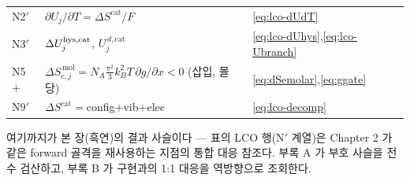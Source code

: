 \begin{table}[t]
\begin{tabular}{l l l}
N2$'$ & $\partial U_j/\partial T=\Delta S^\mathrm{cat}/F$ & \eqref{eq:lco-dUdT} \\
N3$'$ & $\Delta U_j^{\mathrm{hys},\mathrm{cat}}$, $U_j^{\,d,\mathrm{cat}}$ & \eqref{eq:lco-dUhys},\eqref{eq:lco-Ubranch} \\
N5$+$ & $\Delta S_{e,j}^{\,\mathrm{mol}}=N_A\tfrac{\pi^2}{3}k_B^2T\,\partial g/\partial x<0$ (삽입, 몰당) & \eqref{eq:dSemolar},\eqref{eq:ggate} \\
N9$'$ & $\Delta S^\mathrm{cat}=$config$+$vib$+$elec & \eqref{eq:lco-decomp} \\
\bottomrule
\end{tabular}
\end{table}

여기까지가 본 장(흑연)의 결과 사슬이다 --- 표의 LCO 행(N$'$ 계열)은 Chapter 2 가 같은 forward 골격을
재사용하는 지점의 통합 대응 참조다. 부록 A 가 부호 사슬을
전수 검산하고, 부록 B 가 구현과의 1:1 대응을 역방향으로 조회한다.

